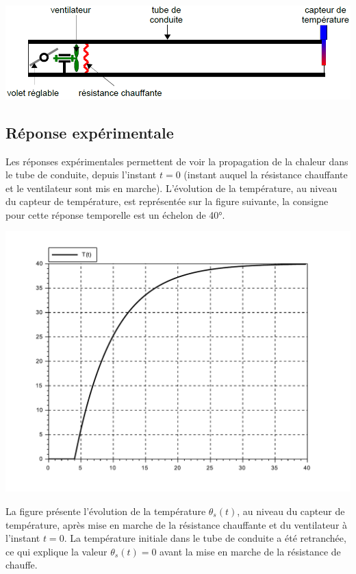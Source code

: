 \begin{center}
 \includegraphics[width=0.9\linewidth]{img/fig5}
\end{center}

\subsection{Réponse expérimentale}

Les réponses expérimentales permettent de voir la propagation de la chaleur dans le tube de conduite, depuis l'instant $t=0$ (instant auquel la résistance chauffante et le ventilateur sont mis en marche). L'évolution de la température, au niveau du capteur de température, est représentée sur la figure suivante, la consigne pour cette réponse temporelle est un échelon de 40°.

\begin{center}
 \includegraphics[width=0.9\linewidth]{img/04}
\end{center}

La figure présente l'évolution de la température $\theta_s(t)$, au niveau du capteur de température, après mise en marche de la résistance chauffante et du ventilateur à l'instant $t=0$. La température initiale dans le tube de conduite a été retranchée, ce qui explique la valeur $\theta_s(t)=0$ avant la mise en marche de la résistance de chauffe.

